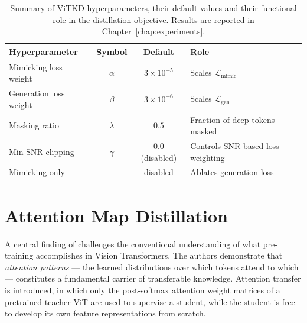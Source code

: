 \begin{table}[ht]
    \centering
    \caption{Summary of ViTKD hyperparameters, their default values and their functional role in the distillation objective. Results are reported in Chapter~\ref{chap:experiments}.}
    \label{tab:vitkd_hyperparams}
    \begin{tabular}{lccl}
        \toprule
        \textbf{Hyperparameter} & \textbf{Symbol} & \textbf{Default} & \textbf{Role} \\
        \midrule
        Mimicking loss weight   & $\alpha$             & $3 \times 10^{-5}$ & Scales $\mathcal{L}_{\text{mimic}}$ \\
        Generation loss weight  & $\beta$              & $3 \times 10^{-6}$ & Scales $\mathcal{L}_{\text{gen}}$ \\
        Masking ratio           & $\lambda$            & $0.5$              & Fraction of deep tokens masked \\
        Min-SNR clipping        & $\gamma$             & $0.0$ (disabled)   & Controls SNR-based loss weighting \\
        Mimicking only          & ---                  & disabled           & Ablates generation loss \\
        \bottomrule
    \end{tabular}
\end{table}


\section{Attention Map Distillation}
\label{sec:attn_kd}

A central finding of \cite{li2024surprising} challenges the conventional understanding of what pre-training accomplishes in Vision Transformers. The authors demonstrate that  \emph{attention patterns} — the learned distributions over which tokens attend to which — constitutes a fundamental carrier of transferable knowledge. Attention transfer is introduced, in which only the post-softmax attention weight matrices of a pretrained teacher ViT are used to supervise a student, while the student is free to develop its own feature representations from scratch.

